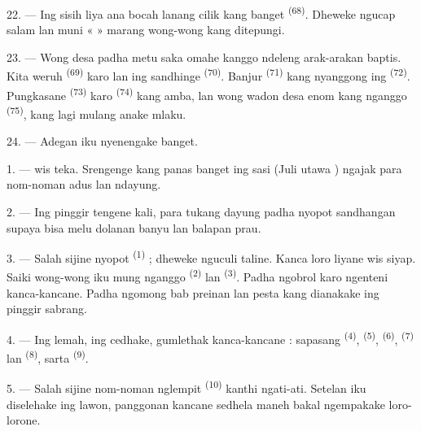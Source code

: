 22. --- Ing sisih liya ana bocah lanang cilik kang 
banget \textsuperscript{(68)}. Dheweke ngucap salam lan muni
«  » marang wong-wong kang ditepungi.

23. --- Wong desa padha metu saka omahe kanggo ndeleng arak-arakan
baptis. Kita weruh  \textsuperscript{(69)} karo
 lan ing sandhinge 
\textsuperscript{(70)}. Banjur 
\textsuperscript{(71)} kang nyanggong ing 
\textsuperscript{(72)}. Pungkasane 
\textsuperscript{(73)} karo  \textsuperscript{(74)}
kang amba, lan wong wadon desa enom kang nganggo 
\textsuperscript{(75)}, kang lagi mulang anake mlaku.

24. --- Adegan iku nyenengake banget.

\VUsaut{4.0mm}
\VUsaut{3.0mm}

\VUsaut{2.4mm}

\VUsaut{3.0mm}

1. ---  wis teka. Srengenge kang panas banget ing
sasi  (Juli utawa ) ngajak para nom-noman
adus lan ndayung.

2. --- Ing pinggir tengene kali, para tukang dayung padha nyopot
sandhangan supaya bisa melu dolanan banyu lan balapan prau.

3. --- Salah sijine nyopot  \textsuperscript{(1)} ;
dheweke nguculi taline. Kanca loro liyane wis siyap. Saiki
wong-wong iku mung nganggo  \textsuperscript{(2)}
lan  \textsuperscript{(3)}. Padha ngobrol karo
ngenteni kanca-kancane. Padha ngomong bab preinan lan pesta kang
dianakake ing pinggir sabrang.

4. --- Ing lemah, ing cedhake, gumlethak 
kanca-kancane : sapasang  \textsuperscript{(4)},
 \textsuperscript{(5)}, 
\textsuperscript{(6)},  \textsuperscript{(7)} lan
 \textsuperscript{(8)}, sarta 
\textsuperscript{(9)}.

5. --- Salah sijine nom-noman nglempit 
\textsuperscript{(10)} kanthi ngati-ati. Setelan iku diselehake ing
lawon, panggonan kancane sedhela maneh bakal ngempakake
 loro-lorone.

